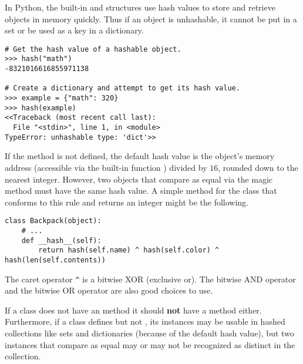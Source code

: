 In Python, the built-in  and  structures use hash values to store and retrieve objects in memory quickly.
Thus if an object is unhashable, it cannot be put in a set or be used as a key in a dictionary.

\begin{lstlisting}
# Get the hash value of a hashable object.
>>> hash("math")
-8321016616855971138

# Create a dictionary and attempt to get its hash value.
>>> example = {"math": 320}
>>> hash(example)
<<Traceback (most recent call last):
  File "<stdin>", line 1, in <module>
TypeError: unhashable type: 'dict'>>
\end{lstlisting}

If the  method is not defined, the default hash value is the object's memory address (accessible via the built-in function ) divided by $16$, rounded down to the nearest integer.
However, two objects that compare as equal via the  magic method must have the same hash value.
A simple  method for the  class that conforms to this rule and returns an integer might be the following.

\begin{lstlisting}
class Backpack(object):
    # ...
    def __hash__(self):
        return hash(self.name) ^ hash(self.color) ^ hash(len(self.contents))
\end{lstlisting}

The caret operator \texttt{\^} is a bitwise XOR (exclusive or).
The bitwise AND operator \li{&} and the bitwise OR operator \li{|} are also good choices to use.

\begin{warn}
If a class does not have an  method it should \textbf{not} have a  method either.
Furthermore, if a class defines  but not , its instances may be usable in hashed collections like sets and dictionaries (because of the default hash value), but two instances that compare as equal may or may not be recognized as distinct in the collection.
\end{warn}
